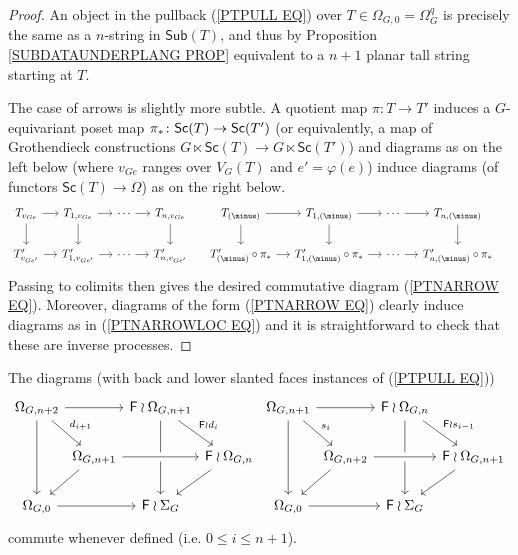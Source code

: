 \documentclass[a4paper,10pt]{article}%
\begin{document}
\begin{proof}
  An object in the pullback (\ref{PTPULL EQ}) over 
  $T\in \Omega_{G,0} = \Omega_G^q$ is precisely the same as a $n$-string in $\mathsf{Sub}(T)$, and thus by Proposition \ref{SUBDATAUNDERPLANG PROP} equivalent to a $n+1$ planar tall string starting at $T$.
  
  The case of arrows is slightly more subtle. A quotient map $\pi \colon T \to T'$ induces a $G$-equivariant poset map 
  $\pi_{\**} \colon \mathsf{Sc}(T) \to \mathsf{Sc}(T')$ 
  (or equivalently, a map of Grothendieck constructions 
  $G \ltimes \mathsf{Sc}(T) \to G \ltimes \mathsf{Sc}(T')$)
  and diagrams as on the left below (where $v_{Ge}$ ranges over $V_G(T)$ and $e'=\varphi(e)$) induce diagrams (of functors $\mathsf{Sc}(T) \to \Omega$) as on the right below.
  \begin{equation} \label{PTNARROWLOC EQ}
    \begin{tikzcd}[column sep=1.2em]
      T_{v_{G e}} \ar{r}{} \ar{d}[swap]{} & 
      T_{1,v_{G e}} \ar{r}{} \ar{d}[swap]{} &
      \cdots \ar{r}{} &
      T_{n,v_{G e}} \ar{d}{} &
      T_{(\minus)} \ar{r}{} \ar{d}[swap]{} & 
      T_{1,(\minus)} \ar{r}{} \ar{d}[swap]{} &
      \cdots \ar{r}{} &
      T_{n,(\minus)} \ar{d}{} &
      \\
      T'_{v_{G e'}} \ar{r}{} &
      T'_{1,v_{G e'}} \ar{r}{} &
      \cdots \ar{r}{} &
      T'_{n,v_{G e'}} &
      T'_{(\minus)}\circ \pi_{\**} \ar{r}{} &
      T'_{1,(\minus)}\circ \pi_{\**} \ar{r}{} &
      \cdots \ar{r}{} &
      T'_{n,(\minus)}\circ \pi_{\**} &
    \end{tikzcd}	
  \end{equation}
  Passing to colimits then gives the desired commutative diagram (\ref{PTNARROW EQ}). Moreover, diagrams of the form (\ref{PTNARROW EQ}) clearly induce diagrams as in  (\ref{PTNARROWLOC EQ}) and it is straightforward to check that these are inverse processes. 
\end{proof}


\begin{remark}\label{DSCOM REM}
  The diagrams (with back and lower slanted faces instances of (\ref{PTPULL EQ}))
  \[
  \begin{tikzcd}[column sep = 0.1em]
    \Omega_{G,{n+2}} \ar{rr} \ar{rd}{d_{i+1}} \ar{dd}
    & & \Fin \wr \Omega_{G,{n+1}} \ar{rd}{\Fin \wr d_i} \ar{dd} & &
    \Omega_{G,{n+1}} \ar{rr} \ar{rd}{s_{i}} \ar{dd} 
    & & \Fin \wr \Omega_{G,{n}} \ar{rd}{\Fin \wr s_{i-1}} \ar{dd} &
    \\
    & \Omega_{G,{n+1}} \ar{ld} \ar[crossing over]{rr} 
    & & \Fin \wr \Omega_{G,{n}} \ar{ld} &
    & \Omega_{G,{n+2}} \ar{ld} \ar[crossing over]{rr} 
    & & \Fin \wr \Omega_{G,{n+1}} \ar{ld}
    \\
    \Omega_{G,0} \ar{rr} & & \Fin \wr \Sigma_G & &
    \Omega_{G,0} \ar{rr} & & \Fin \wr \Sigma_G &
  \end{tikzcd}
  \]
  commute whenever defined (i.e. $0 \leq i \leq n+1$).
\end{remark}
\end{document}
